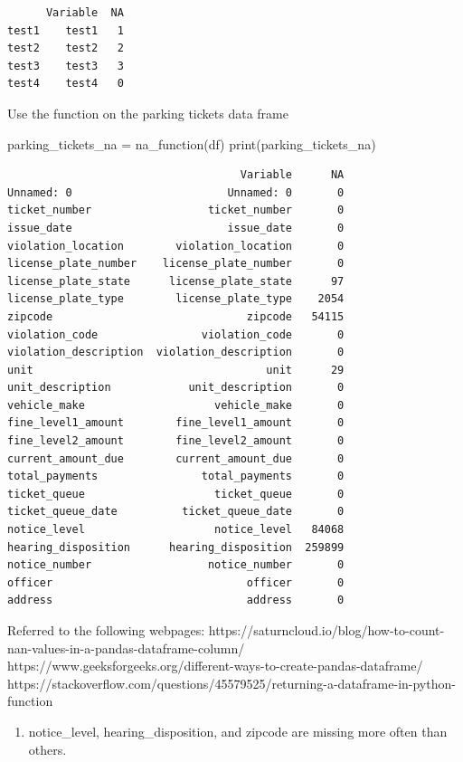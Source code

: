 \documentclass[
]{article}
\newenvironment{Shaded}{\begin{snugshade}}{\end{snugshade}}
\newcommand{\BuiltInTok}[1]{\textcolor[rgb]{0.00,0.23,0.31}{#1}}
\newcommand{\NormalTok}[1]{\textcolor[rgb]{0.00,0.23,0.31}{#1}}
\newcommand{\OperatorTok}[1]{\textcolor[rgb]{0.37,0.37,0.37}{#1}}
\providecommand{\tightlist}{%
  \setlength{\itemsep}{0pt}\setlength{\parskip}{0pt}}\usepackage{longtable,booktabs,array}
\begin{document}
\begin{verbatim}
      Variable  NA
test1    test1   1
test2    test2   2
test3    test3   3
test4    test4   0
\end{verbatim}

Use the function on the parking tickets data frame

\begin{Shaded}
\begin{Highlighting}[]
\NormalTok{parking\_tickets\_na }\OperatorTok{=}\NormalTok{ na\_function(df)}
\BuiltInTok{print}\NormalTok{(parking\_tickets\_na)}
\end{Highlighting}
\end{Shaded}

\begin{verbatim}
                                    Variable      NA
Unnamed: 0                        Unnamed: 0       0
ticket_number                  ticket_number       0
issue_date                        issue_date       0
violation_location        violation_location       0
license_plate_number    license_plate_number       0
license_plate_state      license_plate_state      97
license_plate_type        license_plate_type    2054
zipcode                              zipcode   54115
violation_code                violation_code       0
violation_description  violation_description       0
unit                                    unit      29
unit_description            unit_description       0
vehicle_make                    vehicle_make       0
fine_level1_amount        fine_level1_amount       0
fine_level2_amount        fine_level2_amount       0
current_amount_due        current_amount_due       0
total_payments                total_payments       0
ticket_queue                    ticket_queue       0
ticket_queue_date          ticket_queue_date       0
notice_level                    notice_level   84068
hearing_disposition      hearing_disposition  259899
notice_number                  notice_number       0
officer                              officer       0
address                              address       0
\end{verbatim}

Referred to the following webpages:
https://saturncloud.io/blog/how-to-count-nan-values-in-a-pandas-dataframe-column/
https://www.geeksforgeeks.org/different-ways-to-create-pandas-dataframe/
https://stackoverflow.com/questions/45579525/returning-a-dataframe-in-python-function

\begin{enumerate}
\def\labelenumi{\arabic{enumi}.}
\setcounter{enumi}{1}
\tightlist
\item
  notice\_level, hearing\_disposition, and zipcode are missing more
  often than others.
\end{enumerate}
\end{document}
